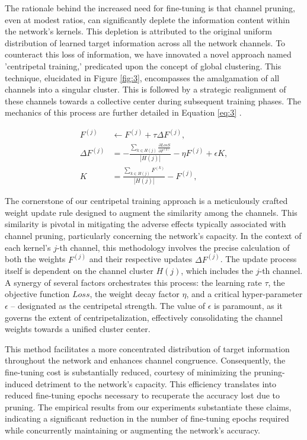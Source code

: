 \documentclass[sigconf, 10pt]{acmart}
\begin{document}
The rationale behind the increased need for fine-tuning is that channel pruning, even at modest ratios, can significantly deplete the information content within the network's kernels. This depletion is attributed to the original uniform distribution of learned target information across all the network channels. To counteract this loss of information, we have innovated a novel approach named 'centripetal training,' predicated upon the concept of global clustering. This technique, elucidated in Figure \ref{fig:3}, encompasses the amalgamation of all channels into a singular cluster. This is followed by a strategic realignment of these channels towards a collective center during subsequent training phases. The mechanics of this process are further detailed in Equation \ref{eq:3} \cite{35}.

\begin{equation}
\begin{aligned}
    F^{(j)} &\leftarrow F^{(j)}+\tau \Delta F^{(j)},
    \\ 
    \Delta F^{(j)} &= -\frac{\sum_{k \in H(j)} \frac{\partial L o s S}{\partial F^{(k)}}}{|H(j)|}-\eta F^{(j)}+\epsilon K,
    \\
    K &= \frac{\sum_{k \in H(j)} F^{(k)}}{|H(j)|}-F^{(j)},
    \label{eq:3}
\end{aligned}
\end{equation}

The cornerstone of our centripetal training approach is a meticulously crafted weight update rule designed to augment the similarity among the channels. This similarity is pivotal in mitigating the adverse effects typically associated with channel pruning, particularly concerning the network's capacity. In the context of each kernel's \( j \)-th channel, this methodology involves the precise calculation of both the weights \( F^{(j)} \) and their respective updates \( \Delta F^{(j)} \). The update process itself is dependent on the channel cluster \( H(j) \), which includes the \( j \)-th channel. A synergy of several factors orchestrates this process: the learning rate \( \tau \), the objective function \( Loss \), the weight decay factor \( \eta \), and a critical hyper-parameter \( \epsilon \) – designated as the centripetal strength. The value of \( \epsilon \) is paramount, as it governs the extent of centripetalization, effectively consolidating the channel weights towards a unified cluster center.

This method facilitates a more concentrated distribution of target information throughout the network and enhances channel congruence. Consequently, the fine-tuning cost is substantially reduced, courtesy of minimizing the pruning-induced detriment to the network's capacity. This efficiency translates into reduced fine-tuning epochs necessary to recuperate the accuracy lost due to pruning. The empirical results from our experiments substantiate these claims, indicating a significant reduction in the number of fine-tuning epochs required while concurrently maintaining or augmenting the network's accuracy.
\end{document}
